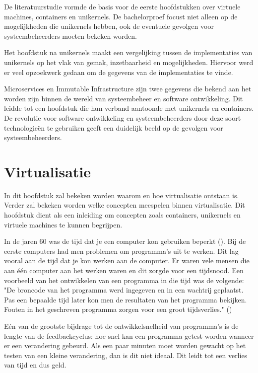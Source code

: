 \documentclass[pdftex,a4paper,12pt,twoside]{report}
\begin{document}
De literatuurstudie vormde de basis voor de eerste hoofdstukken over virtuele machines, containers en unikernels. De bachelorproef focust niet alleen op de mogelijkheden die unikernels hebben, ook de eventuele gevolgen voor systeembeheerders moeten bekeken worden.

Het hoofdstuk na unikernels maakt een vergelijking tussen de implementaties van unikernels op het vlak van gemak, inzetbaarheid en mogelijkheden. Hiervoor werd er veel opzoekwerk gedaan om de gegevens van de implementaties te vinde.

Microservices en Immutable Infrastructure zijn twee gegevens die bekend aan het worden zijn binnen de wereld van systeembeheer en software ontwikkeling. Dit leidde tot een hoofdstuk die hun verband aantoonde met unikernels en containers. De revolutie voor software ontwikkeling en systeembeheerders door deze soort technologieën te gebruiken geeft een duidelijk beeld op de gevolgen voor systeembeheerders.

\chapter{Virtualisatie}
\label{ch:virtualisatie}

In dit hoofdstuk zal bekeken worden waarom en hoe virtualisatie ontstaan is. Verder zal bekeken worden welke concepten meespelen binnen virtualisatie. Dit hoofdstuk dient als een inleiding om concepten zoals containers, unikernels en virtuele machines te kunnen begrijpen.

In de jaren 60 was de tijd dat je een computer kon gebruiken beperkt (\cite{conferences_modern_1968}).  Bij de eerste computers had men problemen om programma's uit te werken. Dit lag vooral aan de tijd dat je kon werken aan de computer. Er waren vele mensen die aan één computer aan het werken waren en dit zorgde voor een tijdsnood. Een voorbeeld van het ontwikkelen van een programma in die tijd was de volgende: "De broncode van het programma werd ingegeven en in een wachtrij geplaatst. Pas een bepaalde tijd later kon men de resultaten van het programma bekijken. Fouten in het geschreven programma zorgen voor een groot tijdsverlies." (\cite{conferences_modern_1968})

Eén van de grootste bijdrage tot de ontwikkelsnelheid van programma's is de lengte van de feedbackcyclus: hoe snel kan een programma getest worden wanneer er een verandering gebeurd. Als een paar minuten moet worden gewacht op het testen van een kleine verandering, dan is dit niet ideaal. Dit leidt tot een verlies van tijd en dus geld.
\end{document}
